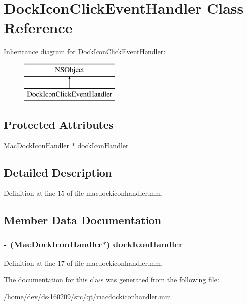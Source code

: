 \hypertarget{interface_dock_icon_click_event_handler}{}\section{Dock\+Icon\+Click\+Event\+Handler Class Reference}
\label{interface_dock_icon_click_event_handler}
Inheritance diagram for Dock\+Icon\+Click\+Event\+Handler\+:\begin{figure}[H]
\begin{center}
\leavevmode
\includegraphics[height=2.000000cm]{interface_dock_icon_click_event_handler}
\end{center}
\end{figure}
\subsection*{Protected Attributes}
\begin{DoxyCompactItemize}
\item 
\hyperlink{class_mac_dock_icon_handler}{Mac\+Dock\+Icon\+Handler} $\ast$ \hyperlink{interface_dock_icon_click_event_handler_aa78888185bb434f259aac3deff007acb}{dock\+Icon\+Handler}
\end{DoxyCompactItemize}


\subsection{Detailed Description}


Definition at line 15 of file macdockiconhandler.\+mm.



\subsection{Member Data Documentation}
\hypertarget{interface_dock_icon_click_event_handler_aa78888185bb434f259aac3deff007acb}{}
\subsubsection[{dock\+Icon\+Handler}]{\setlength{\rightskip}{0pt plus 5cm}-\/ ({\bf Mac\+Dock\+Icon\+Handler}$\ast$) dock\+Icon\+Handler\hspace{0.3cm}{\ttfamily [protected]}}\label{interface_dock_icon_click_event_handler_aa78888185bb434f259aac3deff007acb}


Definition at line 17 of file macdockiconhandler.\+mm.



The documentation for this class was generated from the following file\+:\begin{DoxyCompactItemize}
\item 
/home/dev/ds-\/160209/src/qt/\hyperlink{macdockiconhandler_8mm}{macdockiconhandler.\+mm}\end{DoxyCompactItemize}
